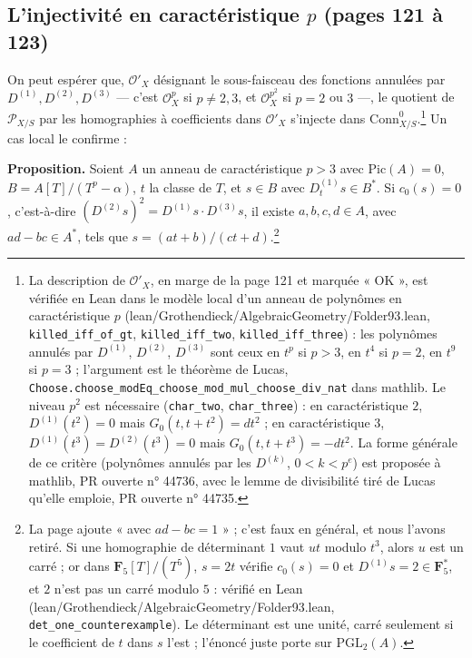 \documentclass[11pt,a4paper]{article}
\begin{document}
\subsection*{L'injectivité en caractéristique $p$ (pages 121 à 123)}

On peut espérer que, $\mathcal{O}'_X$ désignant le sous-faisceau des fonctions
annulées par $D^{(1)}, D^{(2)}, D^{(3)}$ — c'est $\mathcal{O}_X^{p}$ si $p \neq
2,3$, et $\mathcal{O}_X^{p^2}$ si $p = 2$ ou $3$ —, le quotient de $\mathcal{P}_{X/S}$
par les homographies à coefficients dans $\mathcal{O}'_X$ s'injecte dans
$\mathrm{Conn}^0_{X/S}$.\footnote{La description de $\mathcal{O}'_X$, en
marge de la page 121 et marquée « OK », est vérifiée en Lean dans le modèle
local d'un anneau de polynômes en caractéristique $p$
(lean/Grothendieck/AlgebraicGeometry/Folder93.lean, \texttt{killed\_iff\_of\_gt},
\texttt{killed\_iff\_two}, \texttt{killed\_iff\_three}) : les polynômes
annulés par $D^{(1)}$, $D^{(2)}$, $D^{(3)}$ sont ceux en $t^p$ si $p > 3$, en
$t^4$ si $p = 2$, en $t^9$ si $p = 3$ ; l'argument est le théorème de Lucas,
\texttt{Choose.choose\_modEq\_choose\_mod\_mul\_choose\_div\_nat} dans mathlib.
Le niveau $p^2$ est nécessaire (\texttt{char\_two}, \texttt{char\_three}) : en
caractéristique $2$, $D^{(1)}(t^2) = 0$ mais $G_0(t, t + t^2) = dt^2$ ; en
caractéristique $3$, $D^{(1)}(t^3) = D^{(2)}(t^3) = 0$ mais
$G_0(t, t + t^3) = -dt^2$. La forme générale de ce critère (polynômes annulés
par les $D^{(k)}$, $0 < k < p^e$) est proposée à mathlib, PR ouverte
n° 44736, avec le lemme de divisibilité tiré de Lucas qu'elle emploie, PR
ouverte n° 44735.} Un cas local le confirme :

\textbf{Proposition.} Soient $A$ un anneau de caractéristique $p > 3$ avec
$\mathrm{Pic}(A) = 0$, $B = A[T]/(T^p - \alpha)$, $t$ la classe de $T$, et
$s \in B$ avec $D^{(1)}_t s \in B^*$. Si $c_0(s) = 0$, c'est-à-dire
$(D^{(2)} s)^2 = D^{(1)}s \cdot D^{(3)}s$, il existe $a, b, c, d \in A$, avec
$ad - bc \in A^*$, tels que $s = (at + b)/(ct + d)$.\footnote{La page ajoute
« avec $ad - bc = 1$ » ; c'est faux en général, et nous l'avons retiré. Si
une homographie de déterminant $1$ vaut $ut$ modulo $t^3$, alors $u$ est un
carré ; or dans $\mathbf{F}_5[T]/(T^5)$, $s = 2t$ vérifie $c_0(s) = 0$ et
$D^{(1)}s = 2 \in \mathbf{F}_5^*$, et $2$ n'est pas un carré modulo $5$ :
vérifié en Lean (lean/Grothendieck/AlgebraicGeometry/Folder93.lean,
\texttt{det\_one\_counterexample}). Le déterminant est une unité, carré
seulement si le coefficient de $t$ dans $s$ l'est ; l'énoncé juste porte sur
$\mathrm{PGL}_2(A)$.}
\end{document}
